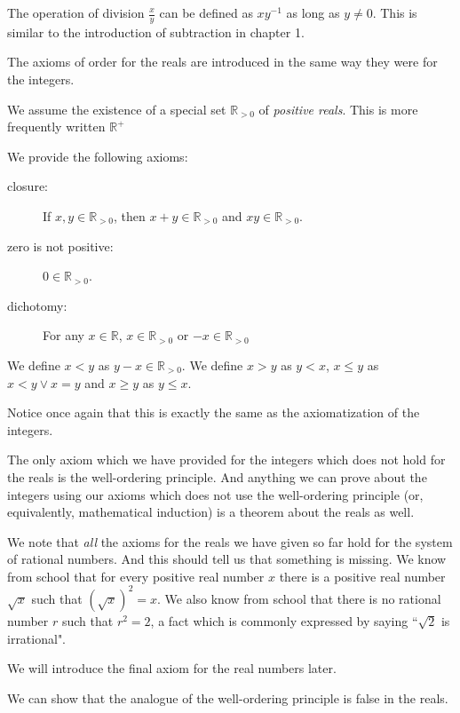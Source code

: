 \documentclass[12pt]{article}
\begin{document}
The operation of division $\frac xy$ can be defined as $xy^{-1}$ as long as $y \neq 0$.  This is similar to the introduction of subtraction in chapter 1.

The axioms of order for the reals are introduced in the same way they were for the integers.

We assume the existence of a special set $\mathbb R_{>0}$ of {\em positive reals\/}.  This is more frequently written ${\mathbb R}^+$

We provide the following axioms:

\begin{description}

\item[closure:]  If $x,y \in \mathbb R_{>0}$, then $x+y \in \mathbb R_{>0}$ and $xy \in \mathbb R_{>0}$.

\item[zero is not positive:]  $0 \in \mathbb R_{>0}$.

\item[dichotomy:]  For any $x \in \mathbb R$, $x \in {\mathbb R}_{>0}$  or $-x \in {\mathbb R}_{>0}$

\end{description}

We define $x<y$ as $y-x \in \mathbb R_{>0}$.  We define $x>y$ as $y<x$, $x \leq y$ as $x<y \vee x=y$ and
$x \geq y$ as $y \leq x$.

Notice once again that this is exactly the same as the axiomatization of the integers.

The only axiom which we have provided for the integers which does not hold for the reals is the well-ordering principle.  And anything we can prove about the integers using our axioms which does not use the well-ordering principle (or, equivalently, mathematical induction) is a theorem about the reals as well.

We note that {\em all\/} the axioms for the reals we have given so far hold for the system of rational numbers.  And this should tell us that something is missing.  We know from school that for every positive real number $x$ there is a positive real number $\sqrt x$ such that $(\sqrt x)^2 = x$.  We also know from school that there is no rational number $r$ such that $r^2 = 2$, a fact which is commonly expressed by saying ``$\sqrt 2$ is irrational".

We will introduce the final axiom for the real numbers later.

We can show that the analogue of the well-ordering principle is false in the reals.
\end{document}
